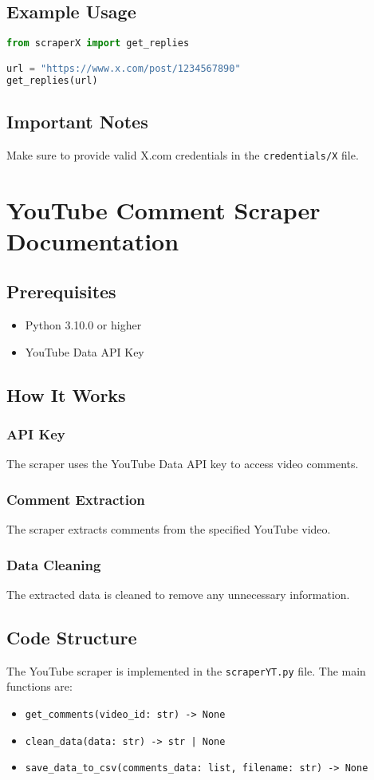 \documentclass[a4paper]{article}
\begin{document}
\subsection{Example Usage}
\begin{lstlisting}[language=python]
from scraperX import get_replies

url = "https://www.x.com/post/1234567890"
get_replies(url)
\end{lstlisting}

\subsection{Important Notes}
Make sure to provide valid X.com credentials in the \texttt{credentials/X} file.

\section{YouTube Comment Scraper Documentation}
\subsection{Prerequisites}
\begin{itemize}
    \item Python 3.10.0 or higher
    \item YouTube Data API Key
\end{itemize}

\subsection{How It Works}
\subsubsection{API Key}
The scraper uses the YouTube Data API key to access video comments.

\subsubsection{Comment Extraction}
The scraper extracts comments from the specified YouTube video.

\subsubsection{Data Cleaning}
The extracted data is cleaned to remove any unnecessary information.

\subsection{Code Structure}
The YouTube scraper is implemented in the \texttt{scraperYT.py} file. The main functions are:
\begin{itemize}
    \item \texttt{get\_comments(video\_id: str) -> None}
    \item \texttt{clean\_data(data: str) -> str | None}
    \item \texttt{save\_data\_to\_csv(comments\_data: list, filename: str) -> None}
\end{itemize}
\end{document}
